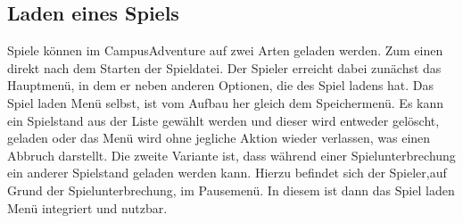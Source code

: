 \subsection{Laden eines Spiels}
Spiele können im CampusAdventure auf zwei Arten geladen werden. Zum einen direkt nach dem Starten
der Spieldatei. Der \gls{Spieler} erreicht dabei zunächst das Hauptmenü, in dem er neben anderen
Optionen, die des Spiel ladens hat. Das Spiel laden Menü selbst, ist vom Aufbau her gleich dem
Speichermenü. Es kann ein Spielstand aus der Liste gewählt werden und dieser wird entweder gelöscht,
geladen oder das Menü wird ohne jegliche Aktion wieder verlassen, was einen Abbruch darstellt. Die 
zweite Variante ist, dass während einer Spielunterbrechung ein anderer Spielstand geladen werden kann.
Hierzu befindet sich der \gls{Spieler},auf Grund der Spielunterbrechung, im Pausemenü. In diesem ist
dann das Spiel laden Menü integriert und nutzbar.
\newpage
\